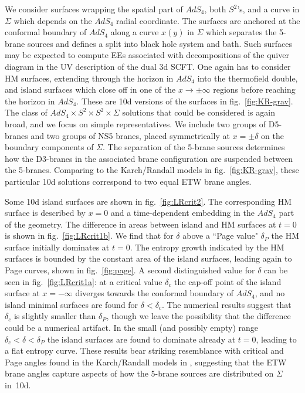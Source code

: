 \documentclass[aps,prd,11pt,notitlepage,longbibliography,nofootinbib,tightenlines,preprintnumbers]{revtex4-1}
\begin{document}
We consider surfaces wrapping the spatial part of $AdS_4$, both $S^2$'s, and a curve in $\Sigma$ which depends on the $AdS_4$ radial coordinate.
The surfaces are anchored at the conformal boundary of $AdS_4$ along a curve $x(y)$ in $\Sigma$ which separates the 5-brane sources and defines a split into black hole system and bath. 
Such surfaces may be expected to compute EEs associated with decompositions of the quiver diagram in the UV description of the dual 3d SCFT.
One again has to consider HM surfaces, extending through the horizon in $AdS_4$ into the thermofield double, and island surfaces which close off in one of the $x\rightarrow\pm\infty$ regions before reaching the horizon in $AdS_4$. These are 10d versions of the surfaces in fig.~\ref{fig:KR-grav}.
%
The class of $AdS_4\times S^2\times S^2\times \Sigma$ solutions that could be considered is again broad, and we focus on simple representatives.
We include two groups of D5-branes and two groups of NS5 branes, placed symmetrically at $x=\pm \delta$ on the boundary components of $\Sigma$. 
%
The separation of the 5-brane sources determines how the D3-branes in the associated brane configuration are suspended between the 5-branes.
Comparing to the Karch/Randall models in fig.~\ref{fig:KR-grav}, these particular 10d solutions correspond to two equal ETW brane angles.

Some 10d island surfaces are shown in fig.~\ref{fig:LRcrit2}. 
The corresponding HM surface is described by $x=0$ and a time-dependent embedding in the $AdS_4$ part of the geometry.
The difference in areas between island and HM surfaces at $t=0$ is shown in fig.~\ref{fig:LRcrit1b}.
We find that for $\delta$ above a ``Page value" $\delta_P$ the HM surface initially dominates at $t=0$.
The entropy growth indicated by the HM surfaces is bounded by the constant area of the island surfaces, leading again to Page curves, shown in fig.~\ref{fig:page}.
A second distinguished value for $\delta$ can be seen in fig.~\ref{fig:LRcrit1a}:
at a critical value $\delta_c$ the cap-off point of the island surface at $x=-\infty$ diverges towards the conformal boundary of $AdS_4$,
and no island minimal surfaces are found for $\delta<\delta_c$.
The numerical results suggest that $\delta_c$ is slightly smaller than $\delta_P$, though we leave the possibility that the difference could be a numerical artifact.
In the small (and possibly empty) range $\delta_c<\delta<\delta_P$ the island surfaces are found to dominate already at $t=0$, leading to a flat entropy curve.
These results bear striking resemblance with critical and Page angles found in the Karch/Randall models in \cite{Geng:2020fxl}, suggesting that the ETW brane angles capture aspects of how the 5-brane sources are distributed on $\Sigma$ in~10d.
\end{document}

